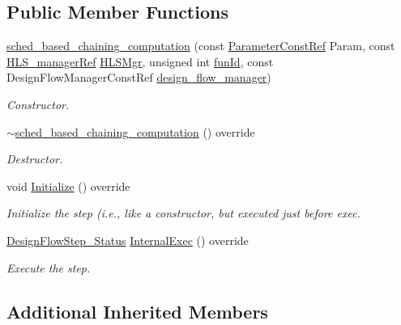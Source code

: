 \subsection*{Public Member Functions}
\begin{DoxyCompactItemize}
\item 
\hyperlink{classsched__based__chaining__computation_a3cd8266c4d472fd3de6f7e147656a911}{sched\+\_\+based\+\_\+chaining\+\_\+computation} (const \hyperlink{Parameter_8hpp_a37841774a6fcb479b597fdf8955eb4ea}{Parameter\+Const\+Ref} Param, const \hyperlink{hls__manager_8hpp_acd3842b8589fe52c08fc0b2fcc813bfe}{H\+L\+S\+\_\+manager\+Ref} \hyperlink{classHLS__step_ade85003a99d34134418451ddc46a18e9}{H\+L\+S\+Mgr}, unsigned int \hyperlink{classHLSFunctionStep_a3e6434fd86c698b0c70520b859bff5b0}{fun\+Id}, const Design\+Flow\+Manager\+Const\+Ref \hyperlink{classDesignFlowStep_ab770677ddf087613add30024e16a5554}{design\+\_\+flow\+\_\+manager})
\begin{DoxyCompactList}\small\item\em Constructor. \end{DoxyCompactList}\item 
\hyperlink{classsched__based__chaining__computation_af282ab6da358a273c46617a1070faa5e}{$\sim$sched\+\_\+based\+\_\+chaining\+\_\+computation} () override
\begin{DoxyCompactList}\small\item\em Destructor. \end{DoxyCompactList}\item 
void \hyperlink{classsched__based__chaining__computation_a86daa9b72e0e2d9a939e80aa22055d4e}{Initialize} () override
\begin{DoxyCompactList}\small\item\em Initialize the step (i.\+e., like a constructor, but executed just before exec. \end{DoxyCompactList}\item 
\hyperlink{design__flow__step_8hpp_afb1f0d73069c26076b8d31dbc8ebecdf}{Design\+Flow\+Step\+\_\+\+Status} \hyperlink{classsched__based__chaining__computation_a9318a49e9ae291770e05f12c7dae246c}{Internal\+Exec} () override
\begin{DoxyCompactList}\small\item\em Execute the step. \end{DoxyCompactList}\end{DoxyCompactItemize}
\subsection*{Additional Inherited Members}


